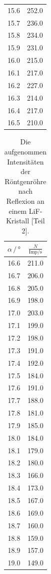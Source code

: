 \begin{table}
\begin{tabular}[t]{cc}
  15.6 & 252.0  \\
  15.7 & 236.0  \\
  15.8 & 234.0  \\
  15.9 & 231.0  \\
  16.0 & 215.0  \\
  16.1 & 217.0  \\
  16.2 & 227.0  \\
  16.3 & 214.0  \\
  16.4 & 217.0  \\
  16.5 & 210.0  \\
  \bottomrule
  \end{tabular}
  \label{tab:emission1}
\end{table}

\begin{table}
  \centering
  \caption{Die aufgenommen Intensitäten der Röntgenröhre nach Reflexion an einem LiF-Kristall [Teil 2].}
  \begin{tabular}[t]{cc}
  \toprule
  $\alpha \,/\, \si{\degree} $ & $\frac{N}{\text{Imp}/\si{\second}}$ \\
  \midrule
  16.6 & 211.0  \\
  16.7 & 206.0  \\
  16.8 & 205.0  \\
  16.9 & 198.0  \\
  17.0 & 203.0  \\
  17.1 & 199.0  \\
  17.2 & 198.0  \\
  17.3 & 191.0  \\
  17.4 & 192.0  \\
  17.5 & 184.0  \\
  17.6 & 191.0  \\
  17.7 & 188.0  \\
  17.8 & 181.0  \\
  17.9 & 185.0  \\
  18.0 & 184.0  \\
  18.1 & 179.0  \\
  18.2 & 180.0  \\
  18.3 & 166.0  \\
  18.4 & 173.0  \\
  18.5 & 167.0  \\
  18.6 & 169.0  \\
  18.7 & 160.0  \\
  18.8 & 159.0  \\
  18.9 & 157.0  \\
  19.0 & 149.0  \\

\end{tabular}
\end{table}
